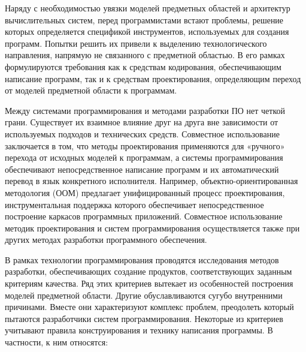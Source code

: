 Наряду с необходимостью увязки моделей предметных областей и архитектур вычислительных систем, перед программистами встают проблемы, решение которых определяется спецификой инструментов, используемых для создания программ. Попытки решить их привели к выделению технологического направления, напрямую не связанного с предметной областью. В его рамках формулируются требования как к средствам кодирования, обеспечивающим написание программ, так и к средствам проектирования, определяющим переход от моделей предметной области к программам.

Между системами программирования и методами разработки ПО нет четкой грани. Существует их взаимное влияние друг на друга вне зависимости от используемых подходов и технических средств. Совместное использование заключается в том, что методы проектирования применяются для «ручного» перехода от исходных моделей к программам, а системы программирования обеспечивают непосредственное написание программ и их автоматический перевод в язык конкретного исполнителя. Например, объектно-ориентированная методология (ООМ) предлагает унифицированный процесс проектирования, инструментальная поддержка которого обеспечивает непосредственное построение каркасов программных приложений. Совместное использование методик проектирования и систем программирования осуществляется также при других методах разработки программного обеспечения.

В рамках технологии программирования проводятся исследования методов разработки, обеспечивающих создание продуктов, соответствующих заданным критериям качества. Ряд этих критериев вытекает из особенностей построения моделей предметной области. Другие обуславливаются сугубо внутренними причинами. Вместе они характеризуют комплекс проблем, преодолеть который пытаются разработчики систем программирования. Некоторые из критериев учитывают правила конструирования и технику написания программы. В частности, к ним относятся:

